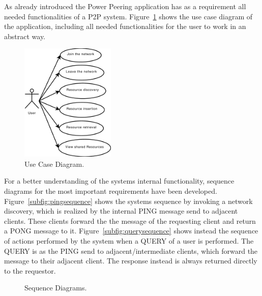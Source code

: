 \documentclass{article}
\begin{document}
As already introduced the Power Peering application has as a requirement all
needed functionalities of a P2P system. Figure~\ref{fig:usecasedia} shows the
use case diagram of the application, including all needed functionalities for
the user to work in an abstract way.
\begin{figure}[!hbtp]
\centering
\includegraphics[width=0.4\textwidth]{../img/UseCaseDiagram.pdf}
\caption{Use Case Diagram.}
\label{fig:usecasedia}
\end{figure}
For a better understanding of the systems internal functionality, sequence
diagrams for the most important requirements have been developed.
Figure~\ref{subfig:pingsequence} shows the systems sequence by invoking a
network discovery, which is realized by the internal PING message send to
adjacent clients. These clients forward the the message of the requesting
client and return a PONG message to it. Figure~\ref{subfig:querysequence} shows
instead the sequence of actions performed by the system when a QUERY of a user
is performed. The QUERY is as the PING send to adjacent/intermediate clients,
which forward the message to their adjacent client. The response instead is
always returned directly to the requestor.
\begin{figure}[!hbtp]
\centering
{}
\caption{Sequence Diagrams.}
\label{fig:sequencediagrams}
\end{figure}
\end{document}

